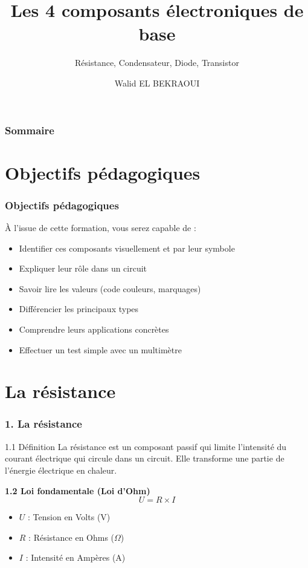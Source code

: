 \documentclass[11pt]{beamer}
\title[Composants Électroniques]{Les 4 composants électroniques de base}
\subtitle{Résistance, Condensateur, Diode, Transistor}
\author[Walid EL BEKRAOUI]{Walid EL BEKRAOUI}
\date[\today]
\begin{document}
\begin{frame}
    \titlepage
\end{frame}

\begin{frame}
    \frametitle{Sommaire}
    \tableofcontents
\end{frame}


\section{Objectifs pédagogiques}
\begin{frame}
    \frametitle{Objectifs pédagogiques}
    À l'issue de cette formation, vous serez capable de :
    \begin{itemize}
        \item Identifier ces composants visuellement et par leur symbole
        \item Expliquer leur rôle dans un circuit
        \item Savoir lire les valeurs (code couleurs, marquages)
        \item Différencier les principaux types
        \item Comprendre leurs applications concrètes
        \item Effectuer un test simple avec un multimètre
    \end{itemize}
\end{frame}

\section{La résistance}
\begin{frame}
    \frametitle{1. La résistance}
    \begin{block}{1.1 Définition}
        La résistance est un composant passif qui limite l'intensité du courant électrique qui circule dans un circuit. Elle transforme une partie de l'énergie électrique en chaleur.
    \end{block}
    
    \textbf{1.2 Loi fondamentale (Loi d'Ohm)}
    $$ U = R \times I $$
    \begin{itemize}
        \item $U$ : Tension en Volts (V)
        \item $R$ : Résistance en Ohms ($\Omega$)
        \item $I$ : Intensité en Ampères (A)
    \end{itemize}
\end{frame}
\end{document}
